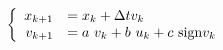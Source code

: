 \documentclass{article}
\begin{document}
\thispagestyle{empty}
\newcommand{\sign}{\text{sign}}


$$
\left \{ \begin{array}{r l}
x_{k+1} & = x_k + \Delta t v_k\\
v_{k+1} & = a~v_k + b~u_k + c~\sign{v_k}
\end{array} \right.
$$
\end{document}
